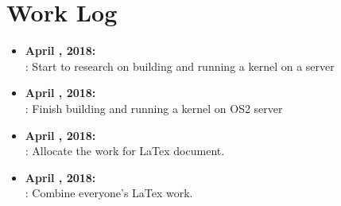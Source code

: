 \documentclass[journal,onecolumn]{IEEEtran}
\begin{document}
\section{Work Log}
\begin{itemize}
\item \textbf{April , 2018:}
		\\: Start to research on building and running a kernel on a server
\item  \textbf{April , 2018:} 
       \\: Finish building and running a kernel on OS2 server
\item  \textbf{April , 2018:} 
       \\: Allocate the work for LaTex document.
\item \textbf{April , 2018:}
      \\: Combine everyone's LaTex work.
\end{itemize}

                

                
\end{document}
